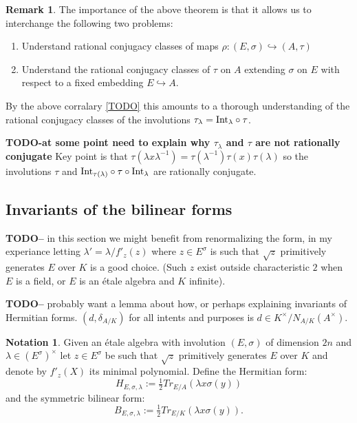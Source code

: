 \documentclass{article}
\theoremstyle{plain}
\theoremstyle{definition}
\newtheorem{notation}[theorem]{Notation}
\newtheorem{remark}[theorem]{Remark}
\numberwithin{equation}{section}
\newcommand{\TODO}[1]{\textbf{TODO-#1}}
\begin{document}
\begin{remark}
The importance of the above theorem is that it allows us to interchange the following two problems:
\begin{enumerate}
\item Understand rational conjugacy classes of maps $\rho: (E,\sigma) \hookrightarrow (A,\tau)$
\item Understand the rational conjugacy classes of $\tau$ on $A$ extending $\sigma$ on $E$ with respect to a fixed embedding $E\hookrightarrow A$.
\end{enumerate}
By the above corralary \ref{TODO} this amounts to a thorough understanding of the rational conjugacy classes of the involutions $\tau_\lambda =  {\rm Int}_\lambda\circ\tau$.


\TODO{at some point need to explain why $\tau_\lambda$ and $\tau$ are not rationally conjugate}
Key point is that $\tau(\lambda x \lambda^{-1}) = \tau(\lambda^{-1}) \tau(x) \tau(\lambda)$ so the involutions $\tau$ and ${\rm Int}_{\tau(\lambda)}\circ \tau\circ {\rm Int}_\lambda$ are rationally conjugate.
\end{remark}

 



\subsection{Invariants of the bilinear forms}

\TODO - in this section we might benefit from renormalizing the form, in my experiance letting $\lambda' = \lambda/f'_z(z)$ where $z\in E^\sigma$ is such that $\sqrt{z}$ primitively generates $E$ over $K$ is a good choice.
(Such $z$ exist outside characteristic $2$ when $E$ is a field, or $E$ is an \'etale algebra and $K$ infinite).

\TODO - probably want a lemma about how, or perhaps explaining invariants of Hermitian forms.
$(d,\delta_{A/K}) $ for all intents and purposes is $d \in K^\times/N_{A/K}(A^\times)$.

\begin{notation}
Given an \'etale algebra with involution $(E,\sigma)$ of dimension $2n$ and $\lambda \in (E^\sigma)^\times$ let $z\in E^\sigma$ be such that $\sqrt{z}$ primitively generates $E$ over $K$ and denote by $f'_z(X)$ its minimal polynomial.
Define the Hermitian form:
\[ H_{E,\sigma,\lambda} := \tfrac{1}{2}Tr_{E/A}\left(\lambda x\sigma(y)\right) \]
and the symmetric bilinear form:
\[ B_{E,\sigma,\lambda} := \tfrac{1}{2}Tr_{E/K}\left(\lambda x\sigma(y)\right). \]
\end{notation}
\end{document}
